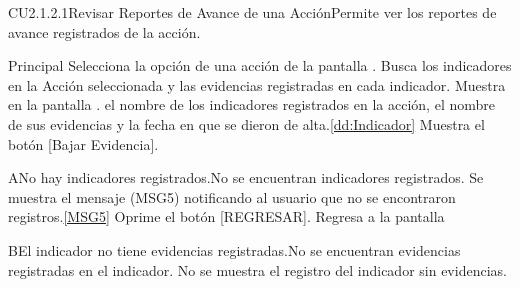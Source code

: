 
	\begin{UseCase}{CU2.1.2.1}{Revisar Reportes de Avance de una Acción}{Permite ver los reportes de avance registrados de la acción.}
	\end{UseCase}
	
	
	\begin{UCtrayectoria}{Principal}
		\UCpaso[\UCactor] Selecciona la opción  de una acción de la pantalla .
		\UCpaso Busca los indicadores en la Acción seleccionada y las evidencias registradas en cada indicador.
		\UCpaso Muestra en la pantalla . el nombre de los indicadores registrados en la acción, el nombre de sus evidencias y la fecha en que se dieron de alta.\ref{dd:Indicador}
		\UCpaso Muestra el botón [Bajar Evidencia].  
		
	\end{UCtrayectoria}
	
		\begin{UCtrayectoriaA}{A}{No hay indicadores registrados.}{No se encuentran indicadores registrados.}
			\UCpaso Se muestra el mensaje (MSG5) notificando al usuario que no se encontraron registros.\ref{MSG5}
			\UCpaso[\UCactor] Oprime el botón [REGRESAR].
			\UCpaso Regresa a la pantalla 
		\end{UCtrayectoriaA}
    
    \begin{UCtrayectoriaA}{B}{El indicador no tiene evidencias registradas.}{No se encuentran evidencias registradas en el indicador.}
      \UCpaso No se muestra el registro del indicador sin evidencias.
    \end{UCtrayectoriaA}
